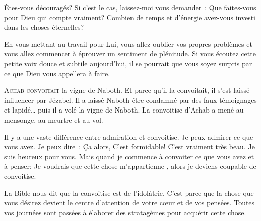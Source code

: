 Êtes-vous découragés? Si c'est le cas, laissez-moi vous demander~:
 Que faites-vous pour Dieu qui compte vraiment?
 Combien de temps et d'énergie avez-vous investi dans les choses éternelles?


En vous mettant au travail pour Lui, vous allez oublier vos propres problèmes
 et vous allez commencer à éprouver un sentiment de plénitude.
 Si vous écoutez cette petite voix douce et subtile aujourd'hui,
 il se pourrait que vous soyez surpris par ce que Dieu vous appellera à faire. 

\dvrule






\lettrine{A}{chab convoitait} la vigne de Naboth.
 Et parce qu'il la convoitait, il s'est laissé influencer par Jézabel.
 Il a laissé Naboth être condamné par des faux témoignages et lapidé\dots{}
 puis il a volé la vigne de Naboth.
 La convoitise d'Achab a mené au mensonge, au meurtre et au vol.

Il y a une vaste différence entre admiration et convoitise.
 Je peux admirer ce que vous avez. Je peux dire~:
 \og Ça alors, C'est formidable! C'est vraiment très beau.
 Je suis heureux pour vous. \fg{}
 Mais quand je commence à convoiter ce que vous avez et à penser:
 \og Je voudrais que cette chose m'appartienne \fg{},
 alors je deviens coupable de convoitise. 


La Bible nous dit que la convoitise est de l'idolâtrie.
 C'est parce que la chose que vous désirez devient le centre d'attention
 de votre c\oe{}ur et de vos pensées.
 Toutes vos journées sont passées à élaborer des stratagèmes
 pour acquérir cette chose. 

